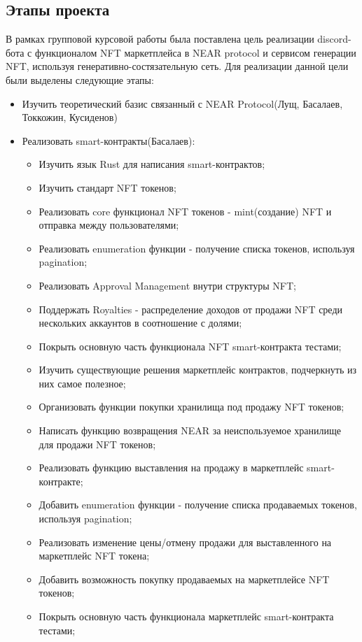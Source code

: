 \subsection{Этапы проекта}
В рамках групповой курсовой работы была поставлена цель реализации discord-бота с функционалом NFT маркетплейса в NEAR protocol и сервисом генерации NFT, используя генеративно-состязательную сеть. Для реализации данной цели были выделены следующие этапы:
\begin{itemize}
    \item Изучить теоретический базис связанный с NEAR Protocol(Лущ, Басалаев, Токкожин, Кусиденов)
    \item Реализовать smart-контракты(Басалаев):
    \begin{itemize}
        \item Изучить язык Rust для написания smart-контрактов;
        \item Изучить стандарт NFT токенов;
        \item Реализовать core функционал NFT токенов - mint(создание) NFT и отправка между пользователями;
        \item Реализовать enumeration функции - получение списка токенов, используя pagination;
        \item Реализовать Approval Management внутри структуры NFT;
        \item Поддержать Royalties - распределение доходов от продажи NFT среди нескольких аккаунтов в соотношение с долями;
        \item Покрыть основную часть функционала NFT smart-контракта тестами;
        \item Изучить существующие решения маркетплейс контрактов, подчеркнуть из них самое полезное;
        \item Организовать функции покупки хранилища под продажу NFT токенов;
        \item Написать функцию возвращения NEAR за неиспользуемое хранилище для продажи NFT токенов;
        \item Реализовать функцию выставления на продажу в маркетплейс smart-контракте;
        \item Добавить enumeration функции - получение списка продаваемых токенов, используя pagination;
        \item Реализовать изменение цены/отмену продажи для выставленного на маркетплейс NFT токена;
        \item Добавить возможность покупку продаваемых на маркетплейсе NFT токенов;
        \item Покрыть основную часть функционала маркетплейс smart-контракта тестами;

\end{itemize}
\end{itemize}
